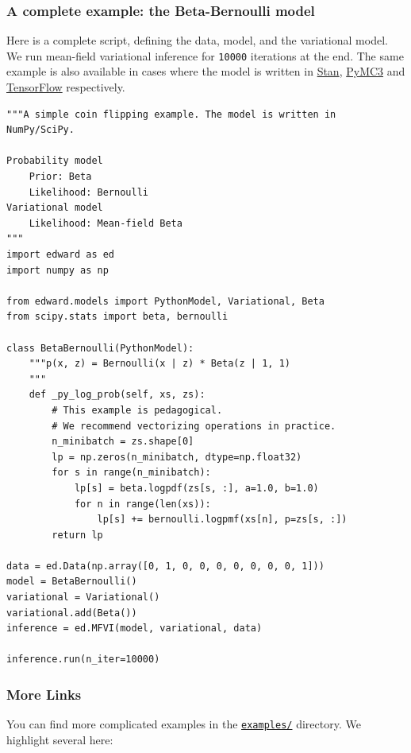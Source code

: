 \subsubsection{A complete example: the Beta-Bernoulli
model}\label{a-complete-example-the-beta-bernoulli-model}

Here is a complete script, defining the data, model, and the variational
model. We run mean-field variational inference for \texttt{10000}
iterations at the end. The same example is also available in cases where
the model is written in
\href{https://github.com/blei-lab/edward/blob/master/examples/beta_bernoulli_stan.py}{Stan},
\href{https://github.com/blei-lab/edward/blob/master/examples/beta_bernoulli_pymc3.py}{PyMC3}
and
\href{https://github.com/blei-lab/edward/blob/master/examples/beta_bernoulli_tf.py}{TensorFlow}
respectively.

\begin{verbatim}
"""A simple coin flipping example. The model is written in NumPy/SciPy.

Probability model
    Prior: Beta
    Likelihood: Bernoulli
Variational model
    Likelihood: Mean-field Beta
"""
import edward as ed
import numpy as np

from edward.models import PythonModel, Variational, Beta
from scipy.stats import beta, bernoulli

class BetaBernoulli(PythonModel):
    """p(x, z) = Bernoulli(x | z) * Beta(z | 1, 1)
    """
    def _py_log_prob(self, xs, zs):
        # This example is pedagogical.
        # We recommend vectorizing operations in practice.
        n_minibatch = zs.shape[0]
        lp = np.zeros(n_minibatch, dtype=np.float32)
        for s in range(n_minibatch):
            lp[s] = beta.logpdf(zs[s, :], a=1.0, b=1.0)
            for n in range(len(xs)):
                lp[s] += bernoulli.logpmf(xs[n], p=zs[s, :])
        return lp

data = ed.Data(np.array([0, 1, 0, 0, 0, 0, 0, 0, 0, 1]))
model = BetaBernoulli()
variational = Variational()
variational.add(Beta())
inference = ed.MFVI(model, variational, data)

inference.run(n_iter=10000)
\end{verbatim}

\subsubsection{More Links}\label{more-links}

You can find more complicated examples in the
\href{https://github.com/blei-lab/edward/tree/master/examples}{\texttt{examples/}}
directory. We highlight several here:

